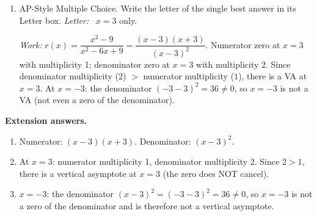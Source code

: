 \documentclass[10pt]{article}
\begin{document}
\begin{enumerate}[itemsep=14pt]
\item AP-Style Multiple Choice. Write the letter of the single best answer in its Letter box. \textit{Letter:}~\gradedblank[id=hw5, type=choice, points=1, answer=C]{0.42in}{13pt} $x = 3$ only.

\textit{Work:} $r(x) = \dfrac{x^2-9}{x^2-6x+9} = \dfrac{(x-3)(x+3)}{(x-3)^2}$.
Numerator zero at $x = 3$ with multiplicity 1; denominator zero at $x = 3$ with multiplicity 2.
Since denominator multiplicity ($2$) $>$ numerator multiplicity ($1$), there is a VA at $x = 3$.
At $x = -3$: the denominator $(-3-3)^2 = 36 \ne 0$, so $x=-3$ is not a VA (not even a zero
of the denominator).

\end{enumerate}

\vspace{0.1in}

\newpage
\begin{extensionbox}
\textbf{Extension answers.}
\begin{enumerate}[label=(\alph*), itemsep=4pt]
  \item Numerator: $(x-3)(x+3)$. Denominator: $(x-3)^2$.
  \item At $x = 3$: numerator multiplicity 1, denominator multiplicity 2. Since $2 > 1$,
        there is a vertical asymptote at $x = 3$ (the zero does NOT cancel).
  \item $x = -3$: the denominator $(x-3)^2 = (-3-3)^2 = 36 \ne 0$, so $x = -3$ is not
        a zero of the denominator and is therefore not a vertical asymptote.
\end{enumerate}
\end{extensionbox}
\end{document}
